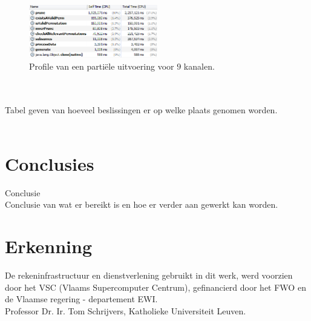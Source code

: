 \documentclass{article}
\begin{document}
\begin{figure}[!h]
\centering
\includegraphics[width=0.5\textwidth]{Profile_Time_9.png}
\caption{Profile van een parti\"ele uitvoering voor $9$ kanalen.} %
\label{ProfileTime9}
\end{figure}

~\\\\
Tabel geven van hoeveel beslissingen er op welke plaats genomen worden.\\ \\



\section{Conclusies}
Conclusie\cite{sortingNetworksSize2014}\\
Conclusie van wat er bereikt is en hoe er verder aan gewerkt kan worden.\cite{sortingNetworksTheEndGame}

\section*{Erkenning}
De rekeninfrastructuur en dienstverlening gebruikt in dit werk, werd voorzien door het VSC (Vlaams Supercomputer Centrum), gefinancierd door het FWO en de Vlaamse regering - departement EWI.\\
Professor Dr. Ir. Tom Schrijvers, Katholieke Universiteit Leuven.





\end{document}
